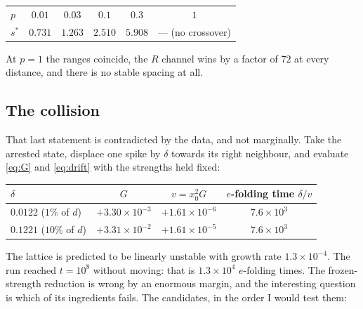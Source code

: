 \documentclass[11pt,a4paper]{article}
\theoremstyle{plain}
\theoremstyle{remark}
\begin{document}
\begin{center}
\begin{tabular}{lccccc}
\toprule
$p$      & $0.01$ & $0.03$ & $0.1$ & $0.3$ & $1$ \\
$s^*$    & $0.731$ & $1.263$ & $2.510$ & $5.908$ & --- (no crossover) \\
\bottomrule
\end{tabular}
\end{center}

\noindent
At $p=1$ the ranges coincide, the $R$ channel wins by a factor of $72$ at every
distance, and there is no stable spacing at all.

\subsection{The collision}

That last statement is contradicted by the data, and not marginally. Take the
arrested state, displace one spike by $\delta$ towards its right neighbour, and
evaluate \eqref{eq:G} and \eqref{eq:drift} with the strengths held fixed:
\begin{center}
\begin{tabular}{lccc}
\toprule
$\delta$ & $G$ & $v = x_0^2 G$ & $e$-folding time $\delta/v$ \\
\midrule
$0.0122$ ($1\%$ of $d$)  & $+3.30\times10^{-3}$ & $+1.61\times10^{-6}$ & $7.6\times10^{3}$ \\
$0.1221$ ($10\%$ of $d$) & $+3.31\times10^{-2}$ & $+1.61\times10^{-5}$ & $7.6\times10^{3}$ \\
\bottomrule
\end{tabular}
\end{center}
The lattice is predicted to be linearly unstable with growth rate
$1.3\times10^{-4}$. The run reached $t = 10^8$ without moving: that is
$1.3\times10^{4}$ $e$-folding times. The frozen-strength reduction is wrong by
an enormous margin, and the interesting question is which of its ingredients
fails. The candidates, in the order I would test them:
\end{document}
